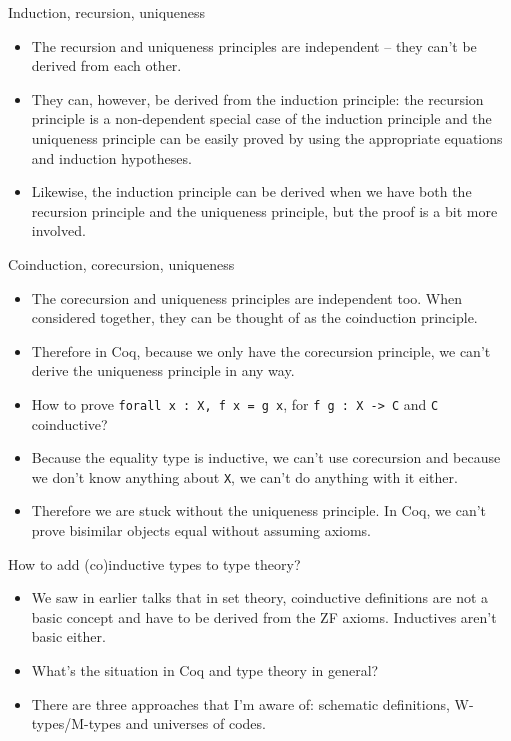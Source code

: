 \documentclass{beamer}
\begin{document}
\begin{frame}{Induction, recursion, uniqueness}
\begin{itemize}
	\item The recursion and uniqueness principles are independent -- they can't be derived from each other.
	\item They can, however, be derived from the induction principle: the recursion principle is a non-dependent special case of the induction principle and the uniqueness principle can be easily proved by using the appropriate equations and induction hypotheses.
	\item Likewise, the induction principle can be derived when we have both the recursion principle and the uniqueness principle, but the proof is a bit more involved.
\end{itemize}
\end{frame}

\begin{frame}{Coinduction, corecursion, uniqueness}
\begin{itemize}
	\item The corecursion and uniqueness principles are independent too. When considered together, they can be thought of as the coinduction principle.
	\item Therefore in Coq, because we only have the corecursion principle, we can't derive the uniqueness principle in any way.
	\item How to prove \texttt{forall x :\ X, f x = g x}, for \texttt{f g :\ X -> C} and \texttt{C} coinductive?
	\item Because the equality type is inductive, we can't use corecursion and because we don't know anything about \texttt{X}, we can't do anything with it either.
	\item Therefore we are stuck without the uniqueness principle. In Coq, we can't prove bisimilar objects equal without assuming axioms.
\end{itemize}
\end{frame}

\begin{frame}{How to add (co)inductive types to type theory?}
\begin{itemize}
	\item We saw in earlier talks that in set theory, coinductive definitions are not a basic concept and have to be derived from the ZF axioms. Inductives aren't basic either.
	\item What's the situation in Coq and type theory in general?
	\item There are three approaches that I'm aware of: schematic definitions, W-types/M-types and universes of codes.
\end{itemize}
\end{frame}
\end{document}
